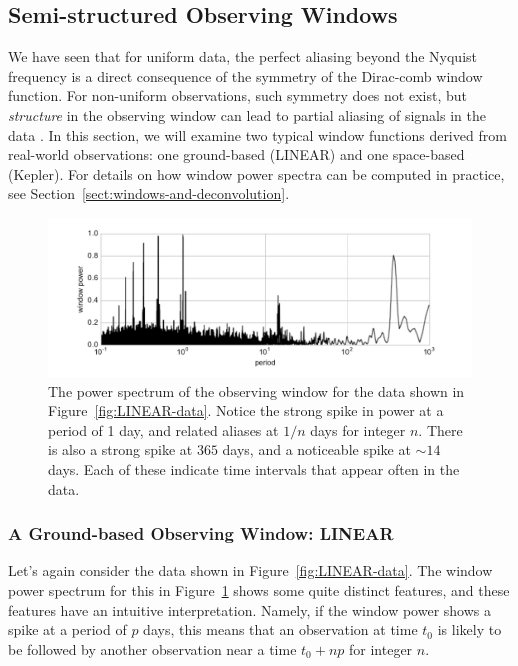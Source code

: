 \documentclass[preprint]{aastex}
\newcommand{\fig}[1]{Figure~\ref{fig:#1}}
\newcommand{\figlabel}[1]{\label{fig:#1}}
\newcommand{\Sect}[1]{Section~\ref{sect:#1}}
\newcommand{\sect}[1]{\Sect{#1}}
\begin{document}
\subsection{Semi-structured Observing Windows}

We have seen that for uniform data, the perfect aliasing beyond the Nyquist
frequency is a direct consequence of the symmetry of the Dirac-comb window
function.
For non-uniform observations, such symmetry does not exist, but {\it structure}
in the observing window can lead to partial aliasing of signals in the
data \citep[see, e.g.][]{Deeming75}.
In this section, we will examine two typical window functions derived from
real-world observations: one ground-based (LINEAR) and one space-based (Kepler).
For details on how window power spectra can be computed in practice, see
\sect{windows-and-deconvolution}.

\begin{figure}[ht]
  \centering
  \includegraphics[width=\textwidth]{fig14_LINEAR_window}
  \caption{The power spectrum of the observing window for the data shown
    in \fig{LINEAR-data}. Notice the strong spike in power at a period of
    1 day, and related aliases at $1/n$ days for integer $n$.
    There is also a strong spike at $365$ days, and a noticeable spike at
    $\sim 14$ days. Each of these indicate time intervals that appear often
    in the data.
    \figlabel{LINEAR-window}}
\end{figure}

\subsubsection{A Ground-based Observing Window: LINEAR}

Let's again consider the data shown in \fig{LINEAR-data}. The window power
spectrum for this in \fig{LINEAR-window} shows some quite distinct features,
and these features have an intuitive interpretation.
Namely, if the window power shows a spike at a period of $p$ days, this means
that an observation at time $t_0$ is likely to be followed by another
observation near a time $t_0 + np$ for integer $n$.
\end{document}
